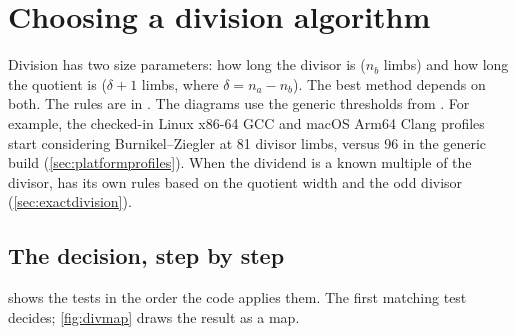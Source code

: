 \chapter{Choosing a division algorithm}
\label{ch:divdispatch}

Division has two size parameters: how long the divisor is ($n_b$ limbs) and how long the
quotient is ($\delta + 1$ limbs, where $\delta = n_a - n_b$). The best method depends on both.
The rules are in . The diagrams use the
generic thresholds from .
For example, the checked-in Linux x86-64 GCC and macOS Arm64 Clang
profiles start considering Burnikel--Ziegler at 81 divisor limbs, versus
96 in the generic build (\cref{sec:platformprofiles}).
When the dividend is a known multiple of the divisor, 
has its own rules based on the quotient width and the odd divisor
(\cref{sec:exactdivision}).

\section{The decision, step by step}

 shows the tests in the order the code applies them. The first
matching test decides; \cref{fig:divmap} draws the result as a map.

